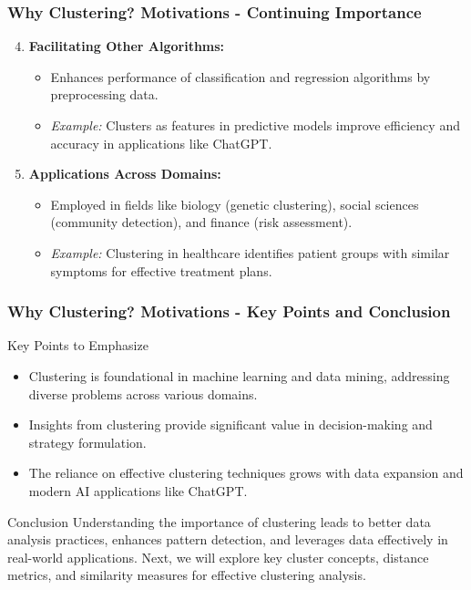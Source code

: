 \documentclass[aspectratio=169]{beamer}
\begin{document}
\begin{frame}[fragile]
    \frametitle{Why Clustering? Motivations - Continuing Importance}
    \begin{enumerate}
        \setcounter{enumi}{3}
        \item \textbf{Facilitating Other Algorithms:}
            \begin{itemize}
                \item Enhances performance of classification and regression algorithms by preprocessing data.
                \item \textit{Example:} Clusters as features in predictive models improve efficiency and accuracy in applications like ChatGPT.
            \end{itemize}
        \item \textbf{Applications Across Domains:}
            \begin{itemize}
                \item Employed in fields like biology (genetic clustering), social sciences (community detection), and finance (risk assessment).
                \item \textit{Example:} Clustering in healthcare identifies patient groups with similar symptoms for effective treatment plans.
            \end{itemize}
    \end{enumerate}
\end{frame}

\begin{frame}[fragile]
    \frametitle{Why Clustering? Motivations - Key Points and Conclusion}
    \begin{block}{Key Points to Emphasize}
        \begin{itemize}
            \item Clustering is foundational in machine learning and data mining, addressing diverse problems across various domains.
            \item Insights from clustering provide significant value in decision-making and strategy formulation.
            \item The reliance on effective clustering techniques grows with data expansion and modern AI applications like ChatGPT.
        \end{itemize}
    \end{block}
    
    \begin{block}{Conclusion}
        Understanding the importance of clustering leads to better data analysis practices, enhances pattern detection, and leverages data effectively in real-world applications. 
        Next, we will explore key cluster concepts, distance metrics, and similarity measures for effective clustering analysis.
    \end{block}
\end{frame}
\end{document}
